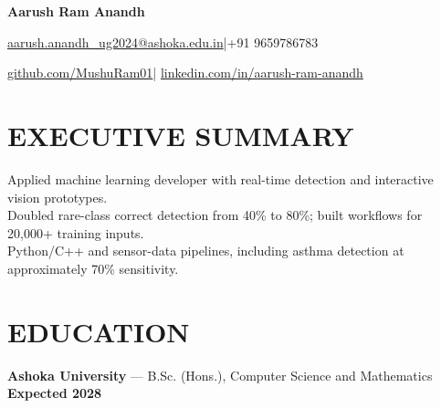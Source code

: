 \documentclass[10pt,a4paper]{article}
\begin{document}
{\LARGE\bfseries Aarush Ram Anandh}\par\vspace{4pt}
\href{mailto:aarush.anandh_ug2024@ashoka.edu.in}{aarush.anandh\_ug2024@ashoka.edu.in}\quad|\quad +91 9659786783\par\vspace{2pt}
\href{https://github.com/MushuRam01}{github.com/MushuRam01}\quad|\quad
\href{https://www.linkedin.com/in/aarush-ram-anandh/}{linkedin.com/in/aarush-ram-anandh}\par

\section{EXECUTIVE SUMMARY}
Applied machine learning developer with real-time detection and interactive vision prototypes.\\
Doubled rare-class correct detection from 40\% to 80\%; built workflows for 20,000+ training inputs.\\
Python/C++ and sensor-data pipelines, including asthma detection at approximately 70\% sensitivity.\par
\section{EDUCATION}
\textbf{Ashoka University} --- B.Sc. (Hons.), Computer Science and Mathematics \hfill \textbf{Expected 2028}
\end{document}
